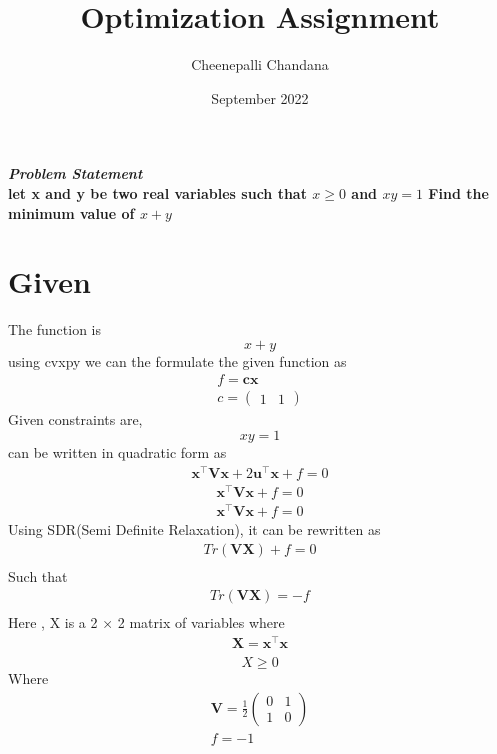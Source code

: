 \documentclass[journal,10pt,twocolumn]{article}
\title{\textbf{Optimization Assignment}}
\author{Cheenepalli Chandana}
\date{September 2022}
\let\vec\mathbf
\newcommand{\myvec}[1]{\ensuremath{\begin{pmatrix}#1\end{pmatrix}}}
\begin{document}
\maketitle
\paragraph{\textit{Problem Statement}\vspace{1mm}\\ let x and y be two real variables such that $x \geq 0$ and $xy=1$ Find the minimum value of $x+y$} 
\section*{\large Given}


The function is
\begin{equation}
x+y
\end{equation}
using cvxpy we can the formulate the given function as
\begin{align}
f = \vec{c}\vec{x}\\
c=\myvec{1&1}
\end{align}
Given constraints are,
\begin{equation}
xy=1
\end{equation}
can be written in quadratic form as
\begin{align}
	\vec{x}^{\top}\vec{V}\vec{x}+2\vec{u}^{\top}\vec{x}+f=0
\end{align}
\begin{align}
	\vec{x}^{\top}\vec{V}\vec{x}+f=0
\end{align}
\begin{align}
	\vec{x}^{\top}\vec{V}\vec{x}+f=0
\end{align}
Using SDR(Semi Definite Relaxation), it
can be rewritten as
\begin{align}
Tr (\vec{V}\vec{X})+f=0\\
\end{align}
Such that
\begin{align}
Tr(\vec{V}\vec{X})=-f\\
\end{align} 
Here , X is a 2 × 2 matrix of variables
where
\begin{align}
\vec{X}=\vec{x}^{\top}\vec{x}\\
\end{align}
\begin{equation}
X\geq 0
\end{equation}
Where
\begin{align}
\vec{V}=\frac{1}{2}\myvec{0&1\\1&0}\\
f=-1
\end{align}
\end{document}
